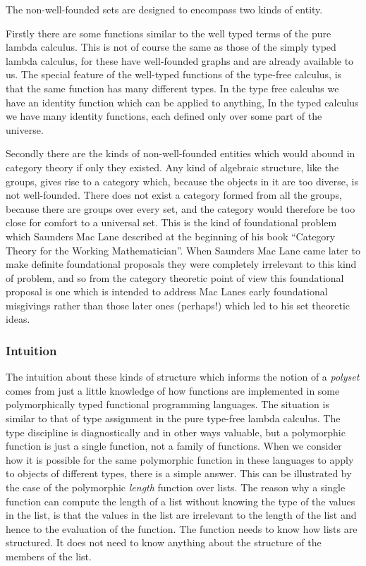 \documentclass{article}
\begin{document}
\begin{article}
The non-well-founded sets are designed to encompass two kinds of entity.

Firstly there are some functions similar to the well typed terms of the pure lambda calculus.
This is not of course the same as those of the simply typed lambda calculus, for these have well-founded graphs and are already available to us.
The special feature of the well-typed functions of the type-free calculus, is that the same function has many different types.
In the type free calculus we have an identity function which can be applied to anything,
In the typed calculus we have many identity functions, each defined only over some part of the universe.

Secondly there are the kinds of non-well-founded entities which would abound in category theory if only they existed.
Any kind of algebraic structure, like the groups, gives rise to a category which, because the objects in it are too diverse, is not well-founded.
There does not exist a category formed from all the groups, because there are groups over every set, and the category would therefore be too close for comfort to a universal set.
This is the kind of foundational problem which Saunders Mac Lane described at the beginning of his book ``Category Theory for the Working Mathematician''.
When Saunders Mac Lane came later to make definite foundational proposals they were completely irrelevant to this kind of problem, and so from the category theoretic point of view this foundational proposal is one which is intended to address Mac Lanes early foundational misgivings rather than those later ones (perhaps!) which led to his set theoretic ideas.

\subsubsection{Intuition}

The intuition about these kinds of structure which informs the notion of a \emph{polyset} comes from just a little knowledge of how functions are implemented in some polymorphically typed functional programming languages.
The situation is similar to that of type assignment in the pure type-free lambda calculus.
The type discipline is diagnostically and in other ways valuable, but a polymorphic function is just a single function, not a family of functions.
When we consider how it is possible for the same polymorphic function in these languages to apply to objects of different types, there is a simple answer.
This can be illustrated by the case of the polymorphic \emph{length} function over lists.
The reason why a single function can compute the length of a list without knowing the type of the values in the list, is that the values in the list are irrelevant to the length of the list and hence to the evaluation of the function.
The function needs to know how lists are structured.
It does not need to know anything about the structure of the members of the list.


\end{article}
\end{document}
